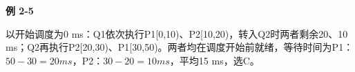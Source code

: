 {\color{ink}\bfseries 例 2-5}\par\vspace{1bp}以开始调度为0 ms：Q1依次执行P1[0,\allowbreak{}10)、P2[10,\allowbreak{}20)，转入Q2时两者剩余20、10 ms；Q2再执行P2[20,\allowbreak{}30)、P1[30,\allowbreak{}50)。两者均在调度开始前就绪，等待时间为P1：\(50-30=\allowbreak{}20 ms\)，P2：\(30-20=\allowbreak{}10 ms\)，平均15 ms，选C。
